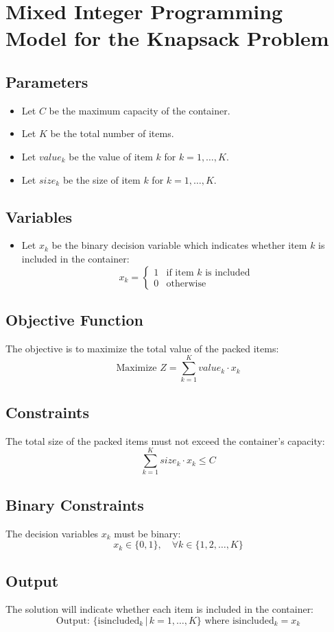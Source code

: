 \documentclass{article}
\begin{document}
\section*{Mixed Integer Programming Model for the Knapsack Problem}

\subsection*{Parameters}
\begin{itemize}
    \item Let \( C \) be the maximum capacity of the container.
    \item Let \( K \) be the total number of items.
    \item Let \( value_k \) be the value of item \( k \) for \( k = 1, \ldots, K \).
    \item Let \( size_k \) be the size of item \( k \) for \( k = 1, \ldots, K \).
\end{itemize}

\subsection*{Variables}
\begin{itemize}
    \item Let \( x_k \) be the binary decision variable which indicates whether item \( k \) is included in the container:
    \[
    x_k = 
    \begin{cases} 
    1 & \text{if item } k \text{ is included} \\
    0 & \text{otherwise}
    \end{cases}
    \]
\end{itemize}

\subsection*{Objective Function}
The objective is to maximize the total value of the packed items:
\[
\text{Maximize } Z = \sum_{k=1}^{K} value_k \cdot x_k
\]

\subsection*{Constraints}
The total size of the packed items must not exceed the container's capacity:
\[
\sum_{k=1}^{K} size_k \cdot x_k \leq C
\]

\subsection*{Binary Constraints}
The decision variables \( x_k \) must be binary:
\[
x_k \in \{0, 1\}, \quad \forall k \in \{1, 2, \ldots, K\}
\]

\subsection*{Output}
The solution will indicate whether each item is included in the container:
\[
\text{Output: } \{ \text{isincluded}_k \,|\, k = 1, \ldots, K \} \text{ where } \text{isincluded}_k = x_k
\]
\end{document}
